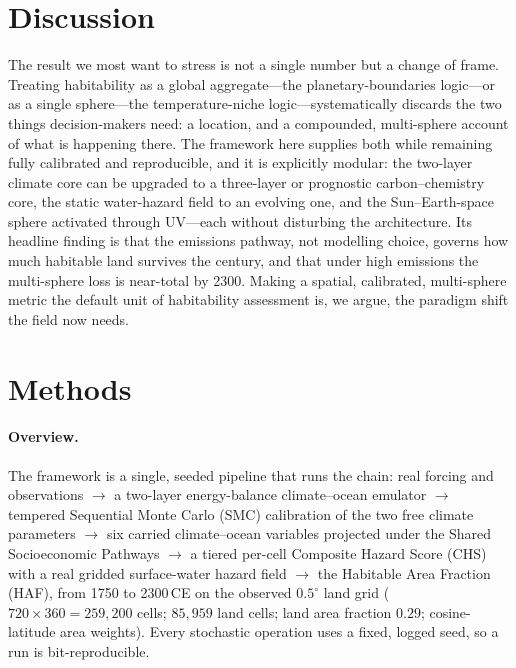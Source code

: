 \documentclass[10pt]{article}
\begin{document}
\section*{Discussion}
The result we most want to stress is not a single number but a change of frame.
Treating habitability as a global aggregate—the planetary-boundaries logic—or as a
single sphere—the temperature-niche logic—systematically discards the two things
decision-makers need: a location, and a compounded, multi-sphere account of what
is happening there. The framework here supplies both while remaining fully
calibrated and reproducible, and it is explicitly modular: the two-layer climate
core can be upgraded to a three-layer or prognostic carbon--chemistry
core\citep{Cummins2020}, the static water-hazard field to an evolving one, and the
Sun--Earth-space sphere activated through UV—each without disturbing the
architecture. Its headline finding is that the emissions pathway, not modelling
choice, governs how much habitable land survives the century, and that under high
emissions the multi-sphere loss is near-total by 2300. Making a spatial,
calibrated, multi-sphere metric the default unit of habitability assessment is,
we argue, the paradigm shift the field now needs.

\section*{Methods}

\paragraph*{Overview.}
The framework is a single, seeded pipeline that runs the chain: real forcing and
observations $\rightarrow$ a two-layer energy-balance climate--ocean emulator
$\rightarrow$ tempered Sequential Monte Carlo (SMC) calibration of the two free
climate parameters $\rightarrow$ six carried climate--ocean variables projected
under the Shared Socioeconomic Pathways $\rightarrow$ a tiered per-cell Composite
Hazard Score (CHS) with a real gridded surface-water hazard field $\rightarrow$
the Habitable Area Fraction (HAF), from 1750 to 2300\,CE on the observed
$0.5^{\circ}$ land grid ($720\times360=259{,}200$ cells; $85{,}959$ land cells;
land area fraction $0.29$; cosine-latitude area weights). Every stochastic
operation uses a fixed, logged seed, so a run is bit-reproducible.
\end{document}
